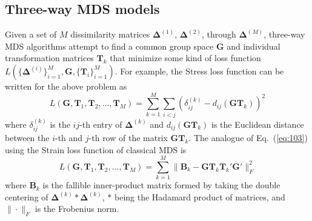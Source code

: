 \subsection{Three-way MDS models}
\label{sec:three-way-mds-1}
Given a set of $M$ dissimilarity matrices $\bm{\Delta}^{(1)}$,
$\bm{\Delta}^{(2)}$, through $\bm{\Delta}^{(M)}$, three-way MDS
algorithms attempt to find a common group space $\mathbf{G}$ and
individual transformation matrices $\mathbf{T}_k$ that minimize some kind
of loss function $L(\{\bm{\Delta}^{(i)}\}_{i=1}^{M}, \mathbf{G},
\{\mathbf{T}_i\}_{i=1}^{M})$. For example, the Stress loss function
\citep{kruskal64:_nonmet} can be written for the above problem as
\begin{equation}
  \label{eq:103}
  L(\mathbf{G}, \mathbf{T}_1, \mathbf{T}_{2}, \dots, \mathbf{T}_M) =
  \sum_{k = 1}^{M}\sum_{i < j} (\delta_{ij}^{(k)} -
  d_{ij}(\mathbf{G}\mathbf{T}_k))^2
\end{equation}
where $\delta_{ij}^{(k)}$ is the $ij$-th entry of $\bm{\Delta}^{(k)}$
and $d_{ij}(\mathbf{G}\mathbf{T}_k)$ is the Euclidean distance between
the $i$-th and $j$-th row of the matrix
$\mathbf{G}\mathbf{T}_k$. The analogue of Eq.~(\ref{eq:103}) using the
Strain loss function of classical MDS \citep{torgersen52:_multid,gower66:_some} is 
\begin{equation}
  \label{eq:107}
  L(\mathbf{G}, \mathbf{T}_1, \mathbf{T}_2, \dots, \mathbf{T}_M)
  = \sum_{k = 1}^{M}\| \mathbf{B}_k -
  \mathbf{G}\mathbf{T}_k \mathbf{T}_k' \mathbf{G}' \|_F^2 
\end{equation}
where $\mathbf{B}_k$ is the fallible inner-product
matrix formed by taking the double centering of $\bm{\Delta}^{(k)}
\ast \bm{\Delta}^{(k)}$, $\ast$ being the Hadamard product of
matrices, and $\| \cdot \|_F$ is the Frobenius norm. \\ \\ 

